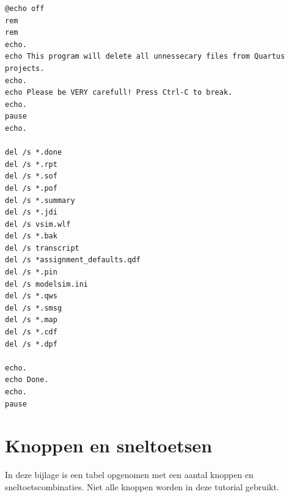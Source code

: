\documentclass[a4paper,12pt,fleqn,twoside]{book}
\newcommand{\menu}[1]{\texttt{\textbf{#1}}}
\def\pijl{$\rightarrow$}%
\begin{document}
\begin{lstlisting}[caption=Windows opruimscript,label=cod:opruim]
@echo off
rem
rem
echo.
echo This program will delete all unnessecary files from Quartus projects.
echo.
echo Please be VERY carefull! Press Ctrl-C to break.
echo.
pause
echo.

del /s *.done
del /s *.rpt
del /s *.sof
del /s *.pof
del /s *.summary
del /s *.jdi
del /s vsim.wlf
del /s *.bak
del /s transcript
del /s *assignment_defaults.qdf
del /s *.pin
del /s modelsim.ini
del /s *.qws
del /s *.smsg
del /s *.map
del /s *.cdf
del /s *.dpf

echo.
echo Done.
echo.
pause
\end{lstlisting}

%

%



\appendix

\chapter{Knoppen en sneltoetsen}
\label{chap:knoppenensneltoetscombinatie}
In deze bijlage is een tabel opgenomen met een aantal knoppen en
sneltoetscombinaties. Niet alle knoppen worden in deze tutorial gebruikt.

\end{document}
